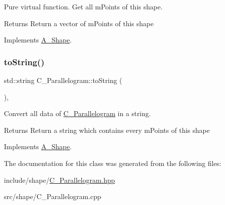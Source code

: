 Pure virtual function. Get all mPoints of this shape.

\begin{DoxyReturn}{Returns}
Return a vector of mPoints of this shape
\end{DoxyReturn}


Implements \hyperlink{classShape_a6eb0d80cccc44cb72b06c61d9780bc6b}{A_Shape}.

\mbox{\label{classParallelogram_a9caae0044f23d8a1e87b1a78d852c37f}} 
\subsubsection{\texorpdfstring{to\+String()}{aToString()}}
{\footnotesize\ttfamily std\+::string C_Parallelogram\+::to\+String (\begin{DoxyParamCaption}{ }\end{DoxyParamCaption})\hspace{0.3cm}{\ttfamily [override]}, {\ttfamily [virtual]}}



Convert all data of \hyperlink{classParallelogram}{C_Parallelogram} in a string.

\begin{DoxyReturn}{Returns}
Return a string which contains every mPoints of this shape
\end{DoxyReturn}


Implements \hyperlink{classShape_a98fa87c6dc4c7045fd6897a8f3bc186c}{A_Shape}.



The documentation for this class was generated from the following files\+:\begin{DoxyCompactItemize}
\item 
include/shape/\hyperlink{Parallelogram_8hpp}{C_Parallelogram.\+hpp}\item
src/shape/C_Parallelogram.\+cpp\end{DoxyCompactItemize}
